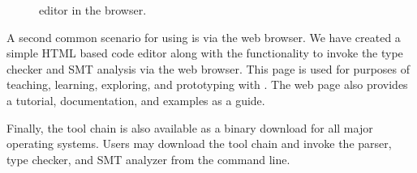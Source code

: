 \begin{figure}
\centering
{}
\caption{\Klang{} editor in the browser.}
\label{fig:k}
\end{figure}

A second common scenario for using \Klang{} is via the web browser. We
have created a simple HTML based \Klang{} code editor along with the
functionality to invoke the type checker and SMT analysis via the web
browser. This page is used for purposes of teaching, learning,
exploring, and prototyping with \Klang{}. The web page also provides a
tutorial, documentation, and \Klang{} examples as a guide. 

Finally, the \Klang{} tool chain is also available as a binary
download for all major operating systems. Users may download the tool
chain and invoke the \Klang{} parser, type checker, and SMT analyzer
from the command line.

